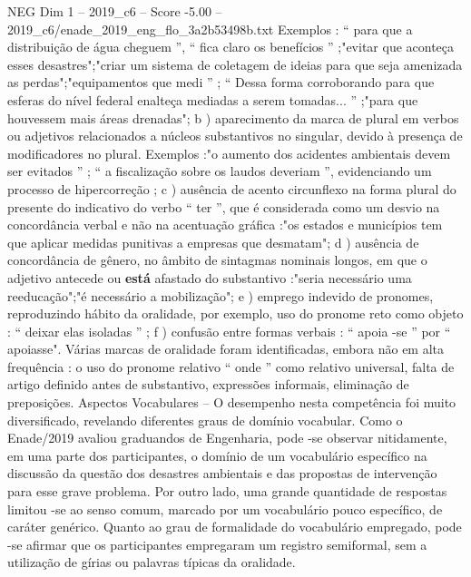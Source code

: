 \begin{textsample}{NEG Dim 1 – 2019\_c6 – Score -5.00 – 2019\_c6/enade\_2019\_eng\_flo\_3a2b53498b.txt}
Exemplos : “ para que a distribuição de água cheguem ”, “ fica claro os benefícios ” ;"evitar que aconteça esses desastres";"criar um sistema de coletagem de ideias para que seja amenizada as perdas";"equipamentos que medi ” ; “ Dessa forma corroborando para que esferas do nível federal enalteça mediadas a serem tomadas... ” ;"para que houvessem mais áreas drenadas"; b ) aparecimento da marca de plural em verbos ou adjetivos relacionados a núcleos substantivos no singular, devido à presença de modificadores no plural.
Exemplos :"o aumento dos acidentes ambientais devem ser evitados ” ; “ a fiscalização sobre os laudos deveriam ”, evidenciando um processo de hipercorreção ; c ) ausência de acento circunflexo na forma plural do presente do indicativo do verbo “ ter ”, que é considerada como um desvio na concordância verbal e não na acentuação gráfica :"os estados e municípios tem que aplicar medidas punitivas a empresas que desmatam"; d ) ausência de concordância de gênero, no âmbito de sintagmas nominais longos, em que o adjetivo antecede ou \textbf{está} afastado do substantivo :"seria necessário uma reeducação";"é necessário a mobilização"; e ) emprego indevido de pronomes, reproduzindo hábito da oralidade, por exemplo, uso do pronome reto como objeto : “ deixar elas isoladas ” ; f ) confusão entre formas verbais : “ apoia -se ” por “ apoiasse".
Várias marcas de oralidade foram identificadas, embora não em alta frequência : o uso do pronome relativo “ onde ” como relativo universal, falta de artigo definido antes de substantivo, expressões informais, eliminação de preposições.
Aspectos Vocabulares – O desempenho nesta competência foi muito diversificado, revelando diferentes graus de domínio vocabular.
Como o Enade/2019 avaliou graduandos de Engenharia, pode -se observar nitidamente, em uma parte dos participantes, o domínio de um vocabulário específico na discussão da questão dos desastres ambientais e das propostas de intervenção para esse grave problema.
Por outro lado, uma grande quantidade de respostas limitou -se ao senso comum, marcado por um vocabulário pouco específico, de caráter genérico.
Quanto ao grau de formalidade do vocabulário empregado, pode -se afirmar que os participantes empregaram um registro semiformal, sem a utilização de gírias ou palavras típicas da oralidade.

\end{textsample}
